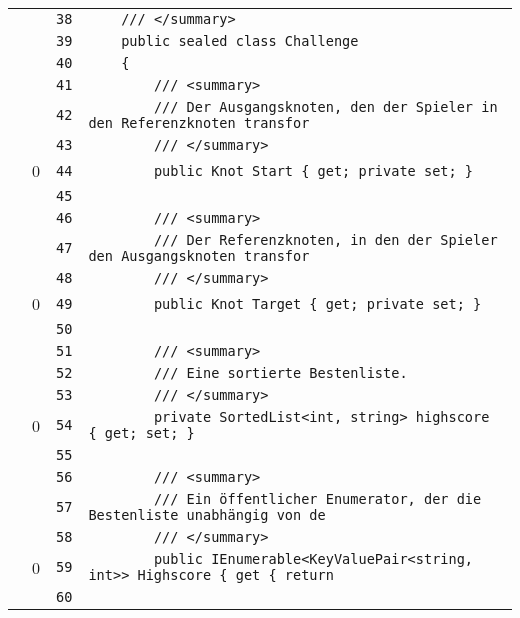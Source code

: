 \documentclass[a4paper,10pt]{article}
\begin{document}
\begin{longtable}[l]{lrrl}
\cellcolor{gray} &  & \verb~38~ & \verb~    /// </summary>~\\
\cellcolor{gray} &  & \verb~39~ & \verb~    public sealed class Challenge~\\
\cellcolor{gray} &  & \verb~40~ & \verb~    {~\\
\cellcolor{gray} &  & \verb~41~ & \verb~        /// <summary>~\\
\cellcolor{gray} &  & \verb~42~ & \verb~        /// Der Ausgangsknoten, den der Spieler in den Referenzknoten transfor~\\
\cellcolor{gray} &  & \verb~43~ & \verb~        /// </summary>~\\
\cellcolor{red} & 0 & \verb~44~ & \verb~        public Knot Start { get; private set; }~\\
\cellcolor{gray} &  & \verb~45~ & \verb~~\\
\cellcolor{gray} &  & \verb~46~ & \verb~        /// <summary>~\\
\cellcolor{gray} &  & \verb~47~ & \verb~        /// Der Referenzknoten, in den der Spieler den Ausgangsknoten transfor~\\
\cellcolor{gray} &  & \verb~48~ & \verb~        /// </summary>~\\
\cellcolor{red} & 0 & \verb~49~ & \verb~        public Knot Target { get; private set; }~\\
\cellcolor{gray} &  & \verb~50~ & \verb~~\\
\cellcolor{gray} &  & \verb~51~ & \verb~        /// <summary>~\\
\cellcolor{gray} &  & \verb~52~ & \verb~        /// Eine sortierte Bestenliste.~\\
\cellcolor{gray} &  & \verb~53~ & \verb~        /// </summary>~\\
\cellcolor{red} & 0 & \verb~54~ & \verb~        private SortedList<int, string> highscore { get; set; }~\\
\cellcolor{gray} &  & \verb~55~ & \verb~~\\
\cellcolor{gray} &  & \verb~56~ & \verb~        /// <summary>~\\
\cellcolor{gray} &  & \verb~57~ & \verb~        /// Ein öffentlicher Enumerator, der die Bestenliste unabhängig von de~\\
\cellcolor{gray} &  & \verb~58~ & \verb~        /// </summary>~\\
\cellcolor{red} & 0 & \verb~59~ & \verb~        public IEnumerable<KeyValuePair<string, int>> Highscore { get { return~\\
\cellcolor{gray} &  & \verb~60~ & \verb~~\\

\end{longtable}
\end{document}
